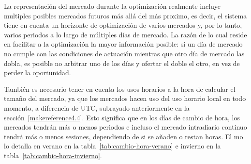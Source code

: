 La representación del mercado durante la optimización realmente incluye multiples posibles mercados futuros más allá del más proximo, es decir, el sistema tiene en cuenta un horizonte de optimización de varios mercados y, por lo tanto, varios periodos a lo largo de múltiples días de mercado. La razón de lo cual reside en facilitar a la optimización la mayor información posible: si un día de mercado no cumple con las condiciones de actuación mientras que otro día de mercado las dobla, es posible no arbitrar uno de los días y ofertar el doble el otro, en vez de perder la oportunidad.

También es necesario tener en cuenta los usos horarios a la hora de calcular el tamaño del mercado, ya que los mercados hacen uso del uso horario local en todo momento, a diferencia de UTC, subrayado anteriormente en la sección~\ref{makereference4.4}. Esto significa que en los días de cambio de hora, los mercados  tendrán más o menos periodos e incluso el mercado intradiario continuo tendrá más o menos sesiones, dependiendo de si se añaden o restan horas. El \gls{mo} lo detalla en verano en la tabla~\ref{tab:cambio-hora-verano} e invierno en la tabla~\ref{tab:cambio-hora-invierno}.

\begin{table}[ht]
  \centering
  \caption[Ajustes del mercado intradiario en cambios de hora de verano.]{Ajustes del mercado intradiario en cambios de hora de verano.}
  \label{tab:cambio-hora-verano}
\end{table}


